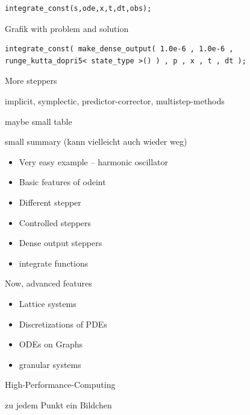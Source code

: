 \begin{frame}[fragile]

\begin{lstlisting}
integrate_const(s,ode,x,t,dt,obs);
\end{lstlisting}

Grafik with problem and solution

\end{frame}

\begin{frame}[fragile]
 
\begin{lstlisting}
integrate_const( make_dense_output( 1.0e-6 , 1.0e-6 , runge_kutta_dopri5< state_type >() ) , p , x , t , dt );
\end{lstlisting}

\end{frame}







\begin{frame}
 More steppers

 implicit, symplectic, predictor-corrector, multistep-methods

 maybe small table
\end{frame}




\begin{frame}
 small summary (kann vielleicht auch wieder weg)
 \begin{itemize}
  \item Very easy example -- harmonic oscillator
  \item Basic features of odeint
  \item Different stepper
  \item Controlled steppers
  \item Dense output steppers
  \item integrate functions
 \end{itemize}

 Now, advanced features

\end{frame}



\begin{frame}

 \begin{itemize}
  \item<1->Lattice systems
  \item<2->Discretizations of PDEs
  \item<3->ODEs on Graphs
  \item<4->granular systems
 \end{itemize}

 High-Performance-Computing

 zu jedem Punkt ein Bildchen
 
\end{frame}



